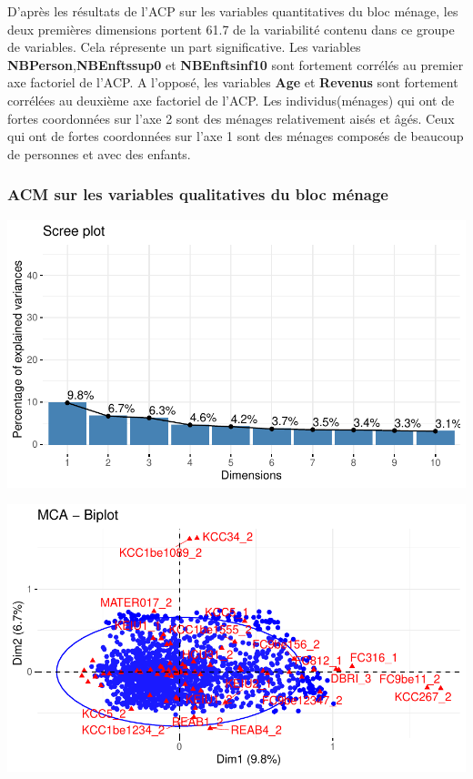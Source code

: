 \documentclass[11pt,a4paper, x11names]{article}\usepackage[]{graphicx}\usepackage[]{color}
\makeatletter
\def\maxwidth{ %
  \ifdim\Gin@nat@width>\linewidth
    \linewidth
  \else
    \Gin@nat@width
  \fi
}
\newenvironment{knitrout}{}{} %
\makeatother
\begin{document}
D'après les résultats de l'ACP sur les variables quantitatives du bloc ménage,
les deux premières dimensions portent 61.7 de la variabilité contenu dans ce groupe de variables. Cela répresente un part significative. Les variables \textbf{NBPerson},\textbf{NBEnftssup0} et \textbf{NBEnftsinf10} sont fortement corrélés au premier axe factoriel de l'ACP. A l'opposé, les variables  \textbf{Age} et \textbf{Revenus} sont fortement corrélées au deuxième axe factoriel de l'ACP. Les individus(ménages) qui ont de fortes coordonnées sur l'axe 2 sont des ménages relativement aisés et âgés. Ceux qui ont de fortes coordonnées sur l'axe 1 sont des ménages composés de beaucoup de personnes et avec des enfants.

\subsubsection{ACM sur les variables qualitatives du bloc ménage}
\begin{minipage}{0.49\linewidth}
\begin{mdframed}
\begin{knitrout}
\color{fgcolor}
\includegraphics[width=\maxwidth]{figure/unnamed-chunk-11-1} 
\end{knitrout}
\end{mdframed}
\end{minipage}
\hfill
\begin{minipage}{0.49\linewidth}
\begin{mdframed}
\begin{knitrout}
\color{fgcolor}
\includegraphics[width=\maxwidth]{figure/unnamed-chunk-12-1} 
\end{knitrout}
\end{mdframed}
\end{minipage}
\end{document}
